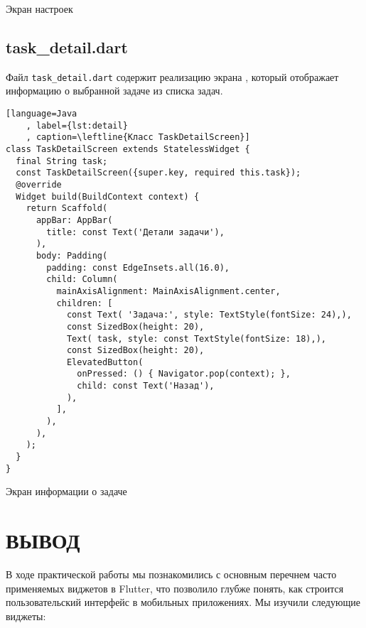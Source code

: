 \begin{image}
	\caption{Экран настроек}
	\label{fig:setting}
\end{image}

\clearpage

\subsection{task\_detail.dart}

Файл \texttt{task\_detail.dart} 
содержит реализацию экрана ,
который отображает информацию о выбранной задаче из списка задач.

\begin{lstlisting}[language=Java
	, label={lst:detail}
	, caption=\leftline{Класс TaskDetailScreen}]
class TaskDetailScreen extends StatelessWidget {
  final String task;
  const TaskDetailScreen({super.key, required this.task});
  @override
  Widget build(BuildContext context) {
    return Scaffold(
      appBar: AppBar(
        title: const Text('Детали задачи'),
      ),
      body: Padding(
        padding: const EdgeInsets.all(16.0),
        child: Column(
          mainAxisAlignment: MainAxisAlignment.center,
          children: [
            const Text( 'Задача:', style: TextStyle(fontSize: 24),),
            const SizedBox(height: 20),
            Text( task, style: const TextStyle(fontSize: 18),),
            const SizedBox(height: 20),
            ElevatedButton(
              onPressed: () { Navigator.pop(context); },
              child: const Text('Назад'),
            ),
          ],
        ),
      ),
    );
  }
}
\end{lstlisting}

\begin{image}
	\caption{Экран информации о задаче}
	\label{fig:detail}
\end{image}

\clearpage

\section*{ВЫВОД}

В ходе практической работы мы познакомились
с основным перечнем часто применяемых виджетов в Flutter,
что позволило глубже понять,
как строится пользовательский интерфейс в мобильных приложениях.
Мы изучили следующие виджеты:

